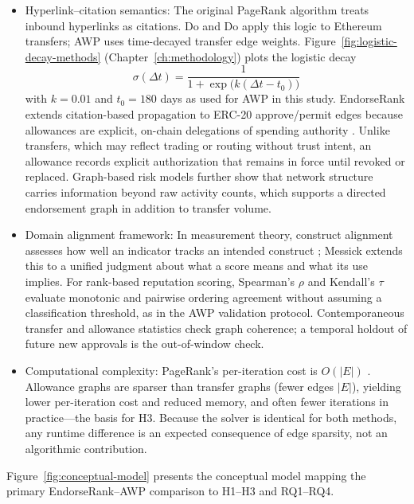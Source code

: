 \begin{itemize}
\item Hyperlink--citation semantics: The original PageRank algorithm  treats inbound hyperlinks as citations. Do and Do apply this logic to Ethereum transfers; AWP uses time-decayed transfer edge weights. Figure~\ref{fig:logistic-decay-methods} (Chapter~\ref{ch:methodology}) plots the logistic decay
\begin{equation}
\sigma(\Delta t)=\frac{1}{1+\exp\bigl(k(\Delta t-t_0)\bigr)}
\label{eq:logistic}
\end{equation}
with $k=0.01$ and $t_0=180$ days as used for AWP in this study. EndorseRank extends citation-based propagation to ERC-20 approve/permit edges because allowances are explicit, on-chain delegations of spending authority . Unlike transfers, which may reflect trading or routing without trust intent, an allowance records explicit authorization that remains in force until revoked or replaced. Graph-based risk models  further show that network structure carries information beyond raw activity counts, which supports a directed endorsement graph in addition to transfer volume.

\item Domain alignment framework: In measurement theory, construct alignment assesses how well an indicator tracks an intended construct ; Messick extends this to a unified judgment about what a score means and what its use implies. For rank-based reputation scoring, Spearman's $\rho$ and Kendall's $\tau$ evaluate monotonic and pairwise ordering agreement without assuming a classification threshold, as in the AWP validation protocol. Contemporaneous transfer and allowance statistics check graph coherence; a temporal holdout of future new approvals is the out-of-window check.

\item Computational complexity: PageRank's per-iteration cost is $O(|E|)$ . Allowance graphs are sparser than transfer graphs (fewer edges $|E|$), yielding lower per-iteration cost and reduced memory, and often fewer iterations in practice---the basis for H3. Because the solver is identical for both methods, any runtime difference is an expected consequence of edge sparsity, not an algorithmic contribution.
\end{itemize}

Figure~\ref{fig:conceptual-model} presents the conceptual model mapping the primary EndorseRank--AWP comparison to H1--H3 and RQ1--RQ4.


